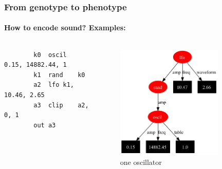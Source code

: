 \documentclass{beamer}
\begin{document}
\begin{frame}[fragile]
	\frametitle{From genotype to phenotype}
	\framesubtitle{How to encode sound? Examples:}
	
	\begin{columns}[t] 
		\begin{lstlisting}
		k0	oscil	0.15, 14882.44, 1
		k1	rand	k0
		a2	lfo	k1, 10.46, 2.65
		a3	clip	a2, 0, 1
		out	a3		\end{lstlisting}
		\begin{figure}[h]
			\centering
				\includegraphics[width=0.8\textwidth]{images/lfo_rand_oscil.jpg}
			\caption{one oscillator}
			\label{sg:fig:images_one_oscil}
		\end{figure}
	\end{columns}
\end{frame}
\end{document}
